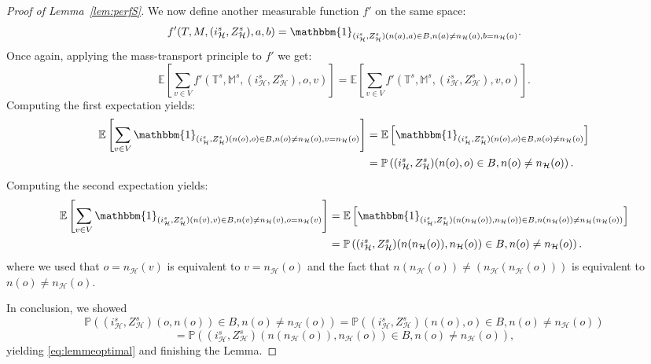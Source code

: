 \documentclass[11pt]{article}
\begin{document}
\begin{proof}[Proof of Lemma~\ref{lem:perfS}]
We now define another measurable function $f'$ on the same space:
\[f'(T,M,(i^s_{\mathcal{H}},Z^s_{\mathcal{H}}),a,b)= \mathbbm{1}_{(i^s_{\mathcal{H}},Z^s_{\mathcal{H}})(n(a),a)\in B, n(a) \neq n_{\mathcal{H}}(a), b=n_{\mathcal{H}}(a)} .\]
Once again, applying the mass-transport principle to $f'$ we get:
\[ \mathbb{E} \left[  \sum_{v\in V} f'(\mathbb{T}^s,\mathbb{M}^s,(i^s_{\mathcal{H}},Z^s_{\mathcal{H}}),o,v) \right] = \mathbb{E} \left[  \sum_{v\in V} f'(\mathbb{T}^s,\mathbb{M}^s,(i^s_{\mathcal{H}},Z^s_{\mathcal{H}}),v,o) \right]  .\]
Computing the first expectation yields:
\begin{align*}
\mathbb{E}\left[ \sum_{v\in V}\mathbbm{1}_{(i^s_{\mathcal{H}},Z^s_{\mathcal{H}})(n(o),o) \in B, n(o) \neq n_{\mathcal{H}}(o), v=n_{\mathcal{H}}(o)}  \right] &= \mathbb{E}\left[ \mathbbm{1}_{(i^s_{\mathcal{H}},Z^s_{\mathcal{H}})(n(o),o)\in B, n(o) \neq n_{\mathcal{H}}(o)} \right] \\
 &= \mathbb{P}\left( (i^s_{\mathcal{H}},Z^s_{\mathcal{H}})(n(o),o) \in B , n(o) \neq n_{\mathcal{H}}(o)  \right) .
 \end{align*}
 Computing the second expectation yields:
 \begin{align*}
\mathbb{E}\left[ \sum_{v\in V}\mathbbm{1}_{(i^s_{\mathcal{H}},Z^s_{\mathcal{H}})(n(v),v) \in B, n(v) \neq n_{\mathcal{H}}(v), o=n_{\mathcal{H}}(v)}  \right] &= \mathbb{E}\left[ \mathbbm{1}_{(i^s_{\mathcal{H}},Z^s_{\mathcal{H}})(n(n_{\mathcal{H}}(o)),n_{\mathcal{H}}(o))\in B, n(n_{\mathcal{H}}(o)) \neq n_{\mathcal{H}}(n_{\mathcal{H}}(o))} \right] \\
 &= \mathbb{P}\left( (i^s_{\mathcal{H}},Z^s_{\mathcal{H}})(n(n_{\mathcal{H}}(o)),n_{\mathcal{H}}(o)) \in B , n(o) \neq n_{\mathcal{H}}(o)  \right) .
 \end{align*}
where we used that $o=n_{\mathcal{H}}(v)$ is equivalent to $v=n_{\mathcal{H}}(o)$ and the fact that $n(n_{\mathcal{H}}(o)) \neq (n_{\mathcal{H}}(n_{\mathcal{H}}(o)))$ is equivalent to $n(o) \neq n_{\mathcal{H}}(o)$. 

In conclusion, we showed
\[ \mathbb{P}\left(  (i^s_{\mathcal{H}},Z^s_{\mathcal{H}})(o,n(o))\in B, n(o)\neq n_{\mathcal{H}}(o) \right)=\mathbb{P}\left( (i^s_{\mathcal{H}},Z^s_{\mathcal{H}})(n(o),o) \in B , n(o) \neq n_{\mathcal{H}}(o)  \right)\]
\[=\mathbb{P}\left(  (i^s_{\mathcal{H}},Z^s_{\mathcal{H}})(n(n_{\mathcal{H}}(o)),n_{\mathcal{H}}(o))\in B, n(o) \neq n_{\mathcal{H}}(o) \right),\]
yielding \eqref{eq:lemmeoptimal} and finishing the Lemma.
\end{proof}
\end{document}

